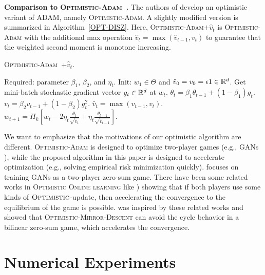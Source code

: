 \documentclass[twoside]{article}
\begin{document}
\textbf{Comparison to \textsc{Optimistic-Adam}~\citep{DISZ18}.}\hspace{0.1in} The authors of \cite{DISZ18} develop an optimistic variant of ADAM, namely \textsc{Optimistic-Adam}. 
A slightly modified version is summarized in Algorithm~\ref{OPT-DISZ}. 
Here, \textsc{Optimistic-Adam$+\hat{v}_t$} is \textsc{Optimistic-Adam} with the additional max operation $\hat{v}_t = \max ( \hat{v}_{t-1}, v_t)$ to guarantee that the weighted second moment is monotone increasing.
\begin{algorithm}[H]
\begin{algorithmic}[1]
\caption{\textsc{Optimistic-Adam~\citep{DISZ18}+$\hat{v}_t$}. \label{OPT-DISZ}}
\STATE Required: parameter $\beta_1$, $\beta_2$, and $\eta_t$.
\STATE Init: $w_1 \in \Theta$ and $\hat{v}_0 = v_{0} = \epsilon 1 \in \mathbb{R}^{d}$.
\STATE Get mini-batch stochastic gradient vector $g_t \in \mathbb{R}^d$ at $w_t$.
\STATE $\theta_t = \beta_{1} \theta_{t-1} + (1 - \beta_{1}) g_t$.
\STATE $v_t = \beta_2 v_{t-1} + (1 - \beta_2) g_t^2$.
\STATE $\hat{v}_t = \max( \hat{v}_{t-1} , v_t )$.
\STATE $w_{t+1} = \Pi_{k}[ w_{t} - 2 \eta_t \frac{\theta_t}{ \sqrt{\hat{v}_t }}
+ \eta_t \frac{\theta_{t-1}}{ \sqrt{\hat{v}_{t-1}} }]$.
\ENDFOR
\end{algorithmic}
\end{algorithm}
We want to emphasize that the motivations of our optimistic algorithm are different. 
\textsc{Optimistic-Adam} is designed to optimize two-player games (e.g., GANs \citep{goodfellow2014generative}), while the proposed algorithm in this paper is designed to accelerate optimization (e.g., solving empirical risk minimization quickly).
\citep{DISZ18} focuses on training GANs \citep{goodfellow2014generative} as a two-player zero-sum game. 
There have been some related works in \textsc{Optimistic Online learning} like \citep{CJ12,RS13b,SALS15}) showing that if both players use some kinds of $\textsc{Optimistic}$-update, then accelerating the convergence to the equilibrium of the game is possible.
\citep{DISZ18} was inspired by these related works and showed that \textsc{Optimistic-Mirror-Descent} can avoid the cycle behavior in a bilinear zero-sum game, which accelerates the convergence. 


\vspace{-0.1in}
\section{Numerical Experiments}\label{sec:numerical}
\vspace{-0.05in}
\end{document}
